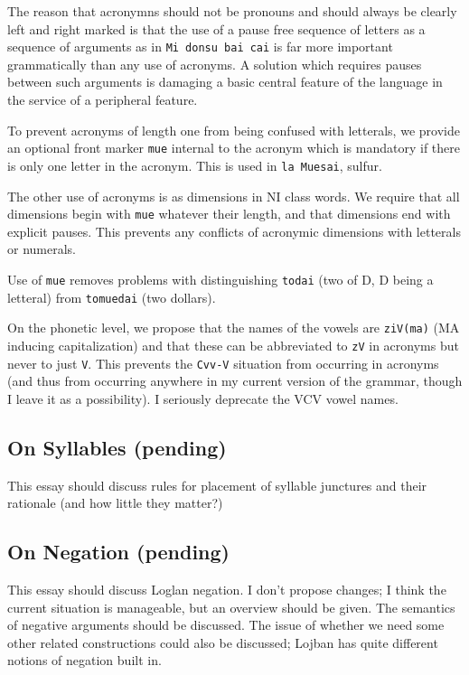 \documentclass[12pt]{article}
\begin{document}
The reason that acronymns should not be pronouns and should always be clearly left and right marked is that the use of a pause free sequence of letters as a sequence of arguments
as in {\tt Mi donsu bai cai} is far more important grammatically than any use of acronyms.   A solution which requires pauses between such arguments is damaging a basic central feature of the language in the service of a peripheral feature.

To prevent acronyms of length one from being confused with letterals, we provide an optional front marker {\tt mue} internal to the acronym which is mandatory if there is only one letter in the acronym.   This is used in {\tt la Muesai}, sulfur.

The other use of acronyms is as dimensions in NI class words.   We require that all dimensions begin with {\tt mue} whatever their length, and that dimensions end with explicit pauses.
This prevents any conflicts of acronymic dimensions with letterals or numerals.  

Use of {\tt mue} removes problems with distinguishing {\tt todai}  (two of D, D being a letteral) from {\tt tomuedai}  (two dollars).

On the phonetic level, we propose that the names of the vowels are {\tt ziV(ma)} (MA inducing capitalization) and that these can be abbreviated to {\tt zV} in acronyms but never to just {\tt V}.  This prevents the {\tt Cvv-V} situation from occurring in acronyms (and thus from occurring anywhere in my current version of the grammar, though I leave it as a possibility).  I seriously deprecate the VCV vowel names.

\subsection{On Syllables (pending)}

This essay should discuss rules for placement of syllable junctures and their rationale (and how little they matter?)

\subsection{On Negation (pending)}

This essay should discuss Loglan negation.  I don't propose changes; I think the current situation is manageable, but an overview should be given.  The semantics of negative arguments should be discussed.   The issue of whether we need some other related constructions could also be discussed; Lojban has quite different notions of negation built in.
\end{document}
